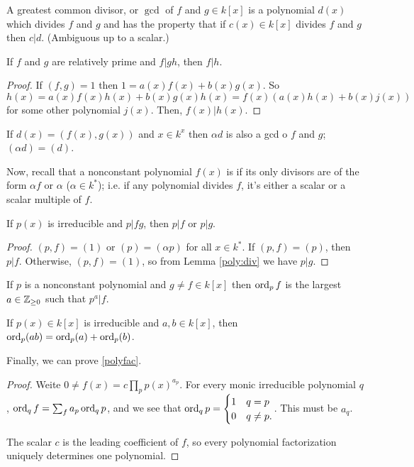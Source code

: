 \documentclass{article}
\begin{document}
\begin{definition} 
    A greatest common divisor, or $\gcd$ of $f$ and $g \in k[x]$ is a polynomial $d(x)$ which divides $f$ and $g$ and has the property that if $c(x) \in k[x]$ divides $f$ and $g$ then $c | d$. (Ambiguous up to a scalar.)
\end{definition}

\begin{lemma}
    \label{poly:div}
    If $f$ and $g$ are relatively prime and $f | gh$, then $f | h$. 
\end{lemma}

\begin{proof}
    If $(f, g) = 1$ then $1 = a(x)f(x) + b(x)g(x)$. So $h(x) = a(x)f(x)h(x) + b(x)g(x)h(x) = f(x)(a(x)h(x) + b(x)j(x))$ for some other polynomial $j(x)$. Then, $f(x) | h(x)$.
\end{proof}

If $d(x) = (f(x), g(x))$ and $x \in k^x$ then $\alpha d$ is also a gcd o $f$ and $g$; $(\alpha d) = (d)$. 

Now, recall that a nonconstant polynomial $f(x)$ is  if its only divisors are of the form $\alpha f$ or $\alpha$ ($\alpha \in k^*$); i.e. if any polynomial divides $f$, it's either a scalar or a scalar multiple of $f$.

\begin{lemma}
    If $p(x)$ is irreducible and $p | fg$, then $p | f$ or $p | g$. 
\end{lemma}

\begin{proof}
    $(p, f) = (1)$ or $(p) = (\alpha p)$ for all $x \in k^*$. If $(p, f) = (p)$, then $p | f$. Otherwise, $(p, f) = (1)$, so from Lemma \ref{poly:div} we have $p | g$. 
\end{proof}

\begin{definition}
    If $p$ is a nonconstant polynomial and $g \neq f \in k[x]$ then $\operatorname{ord}_p f$ is the largest $a \in \mathbb Z_{\geq 0}$ such that $p^a | f$. 
\end{definition}

\begin{lemma}
    If $p(x) \in k[x]$ is irreducible and $a, b \in k[x]$, then $\operatorname{ord}_p(ab) = \operatorname{ord}_p(a) + \operatorname{ord}_p(b)$. 
\end{lemma} 

Finally, we can prove \ref{polyfac}. 

\begin{proof}
    Weite $0 \neq f(x) = c \prod_p p(x)^{a_p}$. For every monic irreducible polynomial $q$, $\operatorname{ord}_q f = \sum_f a_p \operatorname{ord}_q p$, and we see that $\operatorname{ord}_q p = \begin{cases}1 & q = p \\ 0 & q \neq p.\end{cases}$. This must be $a_q$.

    The scalar $c$ is the leading coefficient of $f$, so every polynomial factorization uniquely determines one polynomial. 
\end{proof}
\end{document}
